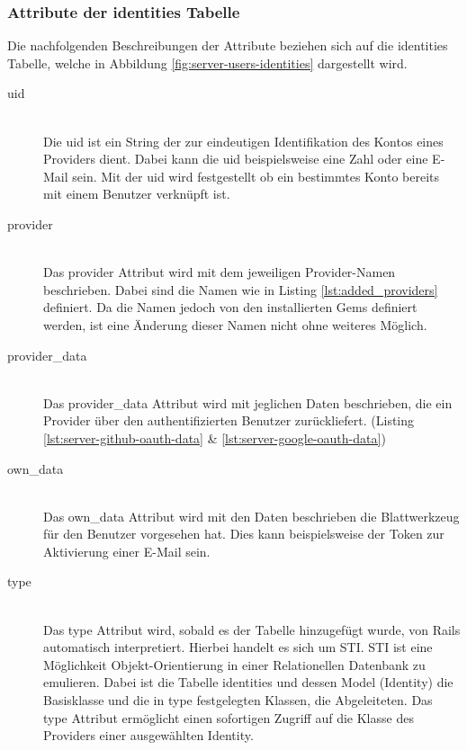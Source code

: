 \subsubsection*{Attribute der identities Tabelle}
Die nachfolgenden Beschreibungen der Attribute beziehen sich auf die identities Tabelle, welche in Abbildung \ref{fig:server-users-identities} dargestellt wird.
\begin{description}
	\item[uid]\hfill\\
	Die uid ist ein String der zur eindeutigen Identifikation des Kontos eines Providers dient. Dabei kann die uid beispielsweise eine Zahl oder eine E-Mail sein. Mit der uid wird festgestellt ob ein bestimmtes Konto bereits mit einem Benutzer verknüpft ist.
	\item[provider]\hfill\\
	Das provider Attribut wird mit dem jeweiligen Provider-Namen beschrieben. Dabei sind die Namen wie in Listing \ref{lst:added_providers} definiert. Da die Namen jedoch von den installierten Gems definiert werden, ist eine Änderung dieser Namen nicht ohne weiteres Möglich.
	\item[provider\_data]\hfill\\
	Das provider\_data Attribut wird mit jeglichen Daten beschrieben, die ein Provider über den authentifizierten Benutzer zurückliefert. (Listing \ref{lst:server-github-oauth-data} \& \ref{lst:server-google-oauth-data})
	
	\begin{minipage}{.42\textwidth}
		
	\end{minipage}\hfill
	\begin{minipage}{.42\textwidth}
		
	\end{minipage}
	
	\item[own\_data]\hfill\\
	Das own\_data Attribut wird mit den Daten beschrieben die Blattwerkzeug für den Benutzer vorgesehen hat. Dies kann beispielsweise der Token zur Aktivierung einer E-Mail sein.
	\item[type]\hfill\\
	Das type Attribut wird, sobald es der Tabelle hinzugefügt wurde, von Rails automatisch interpretiert. Hierbei handelt es sich um \gls{STI}. \gls{STI} ist eine Möglichkeit Objekt-Orientierung in einer Relationellen Datenbank zu emulieren. Dabei ist die Tabelle identities und dessen Model (Identity) die Basisklasse und die in type festgelegten Klassen, die Abgeleiteten. Das type Attribut ermöglicht einen sofortigen Zugriff auf die Klasse des Providers einer ausgewählten Identity.
\end{description}

